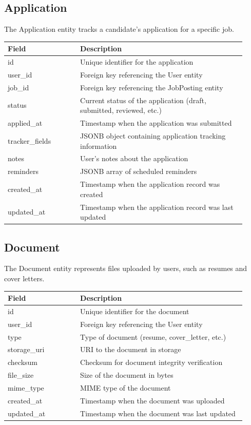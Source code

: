 \documentclass[12pt,a4paper]{report}
\begin{document}
\subsection{Application}
The Application entity tracks a candidate's application for a specific job.

\begin{longtable}{p{0.28\linewidth} p{0.64\linewidth}}
\toprule
\textbf{Field} & \textbf{Description}\\
\midrule
id & Unique identifier for the application\\
user\_id & Foreign key referencing the User entity\\
job\_id & Foreign key referencing the JobPosting entity\\
status & Current status of the application (draft, submitted, reviewed, etc.)\\
applied\_at & Timestamp when the application was submitted\\
tracker\_fields & JSONB object containing application tracking information\\
notes & User's notes about the application\\
reminders & JSONB array of scheduled reminders\\
created\_at & Timestamp when the application record was created\\
updated\_at & Timestamp when the application record was last updated\\
\bottomrule
\end{longtable}

\subsection{Document}
The Document entity represents files uploaded by users, such as resumes and cover letters.

\begin{longtable}{p{0.28\linewidth} p{0.64\linewidth}}
\toprule
\textbf{Field} & \textbf{Description}\\
\midrule
id & Unique identifier for the document\\
user\_id & Foreign key referencing the User entity\\
type & Type of document (resume, cover\_letter, etc.)\\
storage\_uri & URI to the document in storage\\
checksum & Checksum for document integrity verification\\
file\_size & Size of the document in bytes\\
mime\_type & MIME type of the document\\
created\_at & Timestamp when the document was uploaded\\
updated\_at & Timestamp when the document was last updated\\
\bottomrule
\end{longtable}
\end{document}
